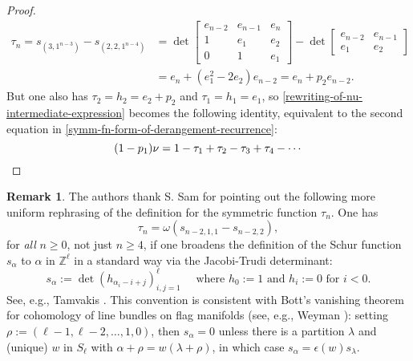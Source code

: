 \documentclass[12pt]{amsart}
\theoremstyle{plain}
\theoremstyle{definition}
\newtheorem{remark}[thm]{Remark}
\begin{document}
\begin{proof}
\begin{equation}
\label{tau-in-terms-of-p-and-e}
\begin{aligned}
\tau_n = s_{(3,1^{n-3})} - s_{(2,2,1^{n-4})}  
& = 
\det\left[
\begin{matrix} 
e_{n-2} & e_{n-1} & e_n \\
1 & e_1 & e_2 \\
0 & 1 & e_1 
\end{matrix}
\right]
-   
\det\left[
\begin{matrix} 
e_{n-2} & e_{n-1} \\
e_1 & e_2
\end{matrix}
\right] \\
 &= e_n + (e_1^2-2e_2)e_{n-2} 
 = e_n + p_2 e_{n-2}.
\end{aligned}
\end{equation}
But one also has $\tau_2=h_2=e_2+p_2$ and $\tau_1=h_1=e_1$,
so \eqref{rewriting-of-nu-intermediate-expression}
becomes the following identity, equivalent to the second
equation in \eqref{symm-fn-form-of-derangement-recurrence}:
$$
(1-p_1) \nu = 1-\tau_1+\tau_2-\tau_3+\tau_4 -\cdots \qedhere 
$$
\end{proof}

\begin{remark}
The authors thank S. Sam for pointing out
the following more uniform rephrasing of the definition for the 
symmetric function $\tau_n$.  One has 
$$
\tau_n=\omega\left( s_{n-2,1,1} - s_{n-2,2} \right),
$$
for {\it all} $n \geq 0$, not just $n \geq 4$, if
one broadens the definition of the Schur
function $s_\alpha$ to $\alpha$ in ${{\mathbb{Z}}}^\ell$
in a standard way via the Jacobi-Trudi determinant:
$$
s_\alpha:=\det \left( h_{\alpha_i-i+j} \right)_{i,j=1}^\ell
\quad \text{ where }h_0:=1\text{ and }h_i:=0\text{ for }i < 0.
$$
See, e.g., Tamvakis \cite[\S 2.2, 3.5]{Tamvakis}.
This convention is consistent with
Bott's vanishing theorem for cohomology of line bundles on flag manifolds
(see, e.g., Weyman \cite[Cor. 4.1.7]{Weyman}): setting
$\rho:=(\ell-1,\ell-2,\ldots,1,0)$, then $s_\alpha=0$ 
unless there is a partition $\lambda$ 
and (unique) $w$ in $S_\ell$ with
$\alpha+\rho=w(\lambda+\rho)$,
in which case $s_\alpha=\epsilon(w) s_\lambda$.  
\end{remark}
\end{document}
